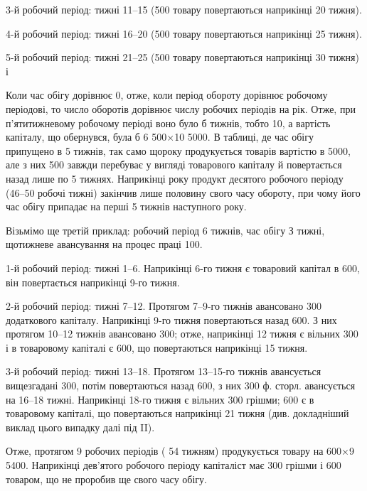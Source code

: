 
3-й робочий період: тижні 11--15 (500 товару повертаються
наприкінці 20 тижня).

4-й робочий період: тижні 16--20 (500 товару повертаються
наприкінці 25 тижня).

5-й робочий період: тижні 21--25 (500 товару повертаються
наприкінці 30 тижня) і~

Коли час обігу дорівнює 0, отже, коли період обороту дорівнює
робочому періодові, то число оборотів дорівнює числу робочих періодів
на рік.
Отже, при п’ятитижневому робочому періоді воно було б \deq{} 
тижнів, тобто 10, а вартість капіталу, що обернувся, була б 6 \deq{} 500×10 \deq{}
5000.
В таблиці, де час обігу припущено в 5 тижнів, так само щороку
продукується товарів вартістю в 5000, але з них  \deq{} 500 завжди перебуває у вигляді товарового капіталу й повертається
назад лише по 5 тижнях. Наприкінці року продукт десятого робочого
періоду (46--50 робочі тижні) закінчив лише половину свого часу
обороту, при чому його час обігу припадає на перші 5 тижнів наступного року.

Візьмімо ще третій приклад: робочий період 6 тижнів, час обігу
З тижні, щотижневе авансування на процес праці 100.

1-й робочий період: тижні 1--6. Наприкінці 6-го тижня є товаровий
капітал в 600, він повертається наприкінці 9-го тижня.

2-й робочий період: тижні 7--12. Протягом 7--9-го тижнів авансовано
300 додаткового капіталу. Наприкінці 9-го тижня повертаються
назад 600. З них протягом 10--12 тижнів авансовано 300; отже, наприкінці 12 тижня є вільних 300 і в товаровому
капіталі є 600, що повертаються наприкінці 15 тижня.

3-й робочий період: тижні 13--18. Протягом 13--15-го тижнів авансується
вищезгадані 300, потім повертаються назад 600,
з них 300 ф. сторл. авансується на 16--18 тижні. Наприкінці 18-го тижня
є вільних 300 грішми; 600 є в товаровому капіталі,
що повертаються наприкінці 21 тижня (див. докладніший виклад
цього випадку далі під II).

Отже, протягом 9 робочих періодів (\deq{} 54 тижням) продукується товару
на 600×9 \deq{} 5400. Наприкінці дев’ятого робочого періоду
капіталіст має 300 грішми і 600 товаром, що не
проробив ще свого часу обігу.

